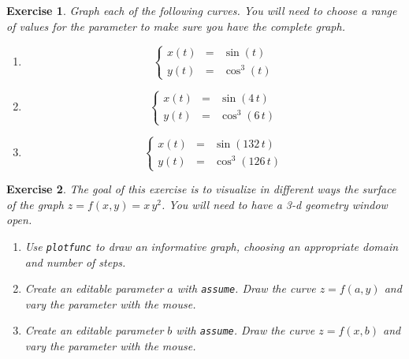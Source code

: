 \documentclass{article}
\newtheorem{exo}{Exercise}[section]
\begin{document}
\begin{exo}{\rm
Graph each of the following curves.  You will need to choose a range
of values for the parameter to make sure you have the complete graph.
\begin{enumerate}
\item
\[
\left\{
\begin{array}{lcl}
x(t)&=& \sin(t)\\
y(t)&=& \cos^3(t)
\end{array}
\right.
\]
\item
\[
\left\{
\begin{array}{lcl}
x(t)&=& \sin(4\,t)\\
y(t)&=& \cos^3(6\,t)
\end{array}
\right.
\]
\item
\[
\left\{
\begin{array}{lcl}
x(t)&=& \sin(132\,t)\\
y(t)&=& \cos^3(126\,t)
\end{array}
\right.
\]
\end{enumerate} 
}\end{exo}
\begin{exo}{\rm
The goal of this exercise is to visualize in different ways the
surface of the graph $z=f(x,y)=x\,y^2$.  You will need to have a
3-d geometry window open.
\begin{enumerate}
\item
Use \texttt{plotfunc} to draw an informative graph, choosing an
appropriate domain and number of steps.
\item
Create an editable parameter $a$ with \texttt{assume}.  Draw the curve
$z=f(a,y)$ and vary the parameter with the mouse.
\item
Create an editable parameter $b$ with \texttt{assume}.  Draw the curve
$z=f(x,b)$ and vary the parameter with the mouse.
\end{enumerate} 
}\end{exo}
\end{document}
